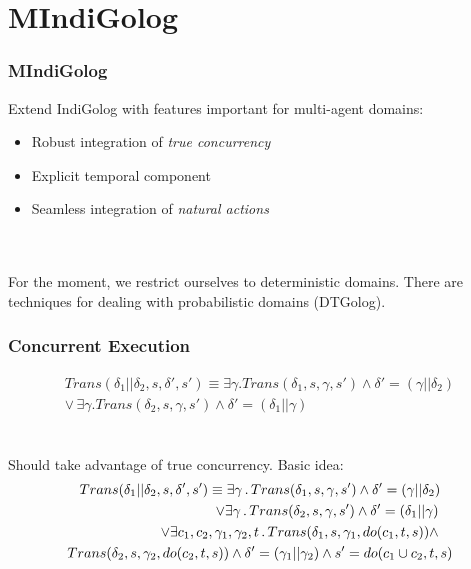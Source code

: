 \documentclass[compress]{beamer}
\begin{document}
\section{MIndiGolog}

\begin{frame}
\frametitle{MIndiGolog}
Extend IndiGolog with features important for multi-agent domains:
\begin{itemize}
\item Robust integration of \emph{true concurrency}
\item Explicit temporal component
\item Seamless integration of \emph{natural actions}
\end{itemize}
\ \\
\ \\
For the moment, we restrict ourselves to deterministic domains.
There are techniques for dealing with probabilistic domains (DTGolog).
\end{frame}

\begin{frame}
\frametitle{Concurrent Execution}
\begin{multline*}
Trans(\delta_{1}||\delta_{2},s,\delta',s')\equiv\exists\gamma.Trans(\delta_{1},s,\gamma,s')\wedge\delta'=(\gamma||\delta_{2})\\
\vee\,\exists\gamma.Trans(\delta_{2},s,\gamma,s')\wedge\delta'=(\delta_{1}||\gamma)
\end{multline*}
\ \\
\ \\
\pause
Should take advantage of true concurrency.  Basic idea:
\begin{multline*}
Trans(\delta_{1}||\delta_{2},s,\delta',s')\equiv\exists\gamma\,.\, Trans(\delta_{1},s,\gamma,s')\wedge\delta'=(\gamma||\delta_{2})\\
\shoveright{\vee\exists\gamma\,.\, Trans(\delta_{2},s,\gamma,s')\wedge\delta'=(\delta_{1}||\gamma)}\\
\shoveright{\vee\exists c_{1},c_{2},\gamma_{1},\gamma_{2},t\,.\, Trans(\delta_{1},s,\gamma_{1},do(c_{1},t,s))\wedge}\\ 
Trans(\delta_{2},s,\gamma_{2},do(c_{2},t,s))\wedge\delta'=(\gamma_{1}||\gamma_{2})\wedge s'=do(c_{1}\cup c_{2},t,s)
\end{multline*}
\end{frame}
\end{document}
